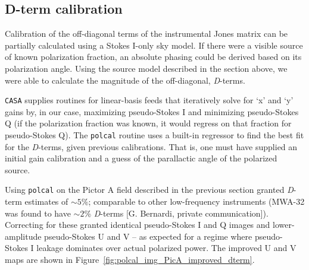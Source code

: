 \subsection{D-term calibration}
\label{subsec:polcal_Dterms}

Calibration of the off-diagonal terms of the instrumental Jones matrix can be partially calculated using a Stokes I-only sky model. If there were a visible source of known polarization fraction, an absolute phasing could be derived based on its polarization angle. Using the source model described in the section above, we were able to calculate the magnitude of the off-diagonal, \textit{D}-terms.

{\tt CASA} supplies routines for linear-basis feeds that iteratively solve for `x' and `y' gains by, in our case, maximizing pseudo-Stokes I and minimizing pseudo-Stokes Q (if the polarization fraction was known, it would regress on that fraction for pseudo-Stokes Q). The {\tt polcal} routine uses a built-in regressor to find the best fit for the \textit{D}-terms, given previous calibrations. That is, one must have supplied an initial gain calibration and a guess of the parallactic angle of the polarized source.

Using {\tt polcal} on the Pictor A field described in the previous section granted \textit{D}-term estimates of $\sim5\%$; comparable to other low-frequency instruments (MWA-32 was found to have $\sim2$\% \textit{D}-terms [G. Bernardi, private communication]). Correcting for these granted identical pseudo-Stokes I and Q images and lower-amplitude pseudo-Stokes U and V -- as expected for a regime where pseudo-Stokes I leakage dominates over actual polarized power. The improved U and V maps are shown in Figure~\ref{fig:polcal_img_PicA_improved_dterm}.

